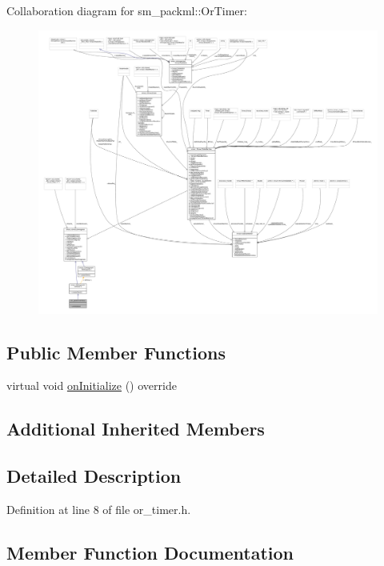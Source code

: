 Collaboration diagram for sm\+\_\+packml\+:\+:Or\+Timer\+:
\nopagebreak
\begin{figure}[H]
\begin{center}
\leavevmode
\includegraphics[width=350pt]{classsm__packml_1_1OrTimer__coll__graph}
\end{center}
\end{figure}
\subsection*{Public Member Functions}
\begin{DoxyCompactItemize}
\item 
virtual void \hyperlink{classsm__packml_1_1OrTimer_a8d58fc4bc720607c22db35a13f05826e}{on\+Initialize} () override
\end{DoxyCompactItemize}
\subsection*{Additional Inherited Members}


\subsection{Detailed Description}


Definition at line 8 of file or\+\_\+timer.\+h.



\subsection{Member Function Documentation}
